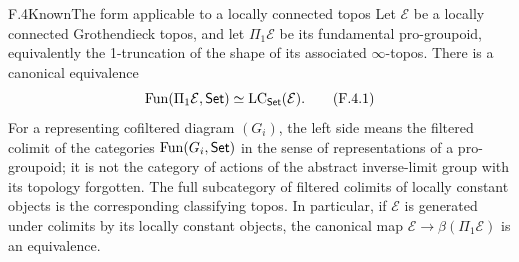 \begin{claim}{F.4}{Known}{The form applicable to a locally connected topos}
Let $\mathcal E$ be a locally connected Grothendieck topos, and
let $\Pi_1\mathcal E$ be its fundamental pro-groupoid, equivalently
the 1-truncation of the shape of its associated $\infty$-topos.
There is a canonical equivalence
\[
 \operatorname{Fun}(\Pi_1\mathcal E,\mathsf{Set})
             \simeq\operatorname{LC}_{\mathsf{Set}}(\mathcal E).                   \tag{F.4.1}
\]
For a representing cofiltered diagram $(G_i)$, the left side means
the filtered colimit of the categories $\operatorname{Fun}(G_i,\mathsf{Set})$ in the
sense of representations of a pro-groupoid; it is not the category
of actions of the abstract inverse-limit group with its topology
forgotten.  The full subcategory of filtered colimits of locally
constant objects is the corresponding classifying topos.  In
particular, if $\mathcal E$ is generated under colimits by its
locally constant objects, the canonical map
$\mathcal E\to\beta(\Pi_1\mathcal E)$ is an equivalence.
\end{claim}
